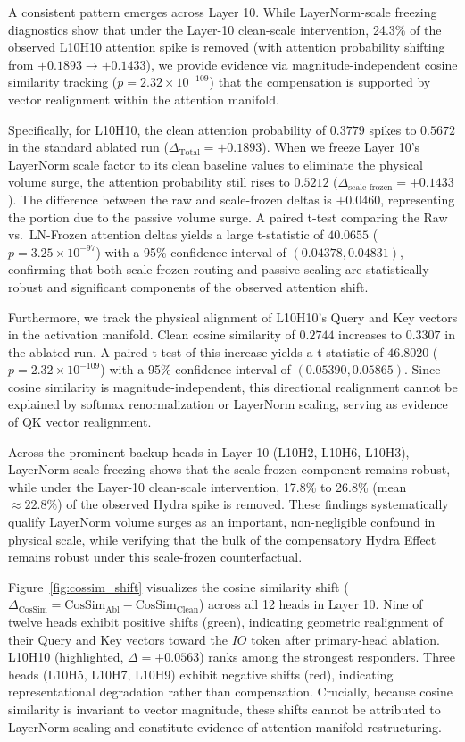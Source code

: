 \documentclass[12pt,a4paper]{article}
\begin{document}
A consistent pattern emerges across Layer 10. While LayerNorm-scale freezing diagnostics show that under the Layer-10 clean-scale intervention, 24.3\% of the observed L10H10 attention spike is removed (with attention probability shifting from $+0.1893 \to +0.1433$), we provide evidence via magnitude-independent cosine similarity tracking ($p = 2.32 \times 10^{-109}$) that the compensation is supported by vector realignment within the attention manifold.

Specifically, for L10H10, the clean attention probability of $0.3779$ spikes to $0.5672$ in the standard ablated run ($\Delta_\text{Total} = +0.1893$). When we freeze Layer 10's LayerNorm scale factor to its clean baseline values to eliminate the physical volume surge, the attention probability still rises to $0.5212$ ($\Delta_\text{scale-frozen} = +0.1433$). The difference between the raw and scale-frozen deltas is $+0.0460$, representing the portion due to the passive volume surge. A paired t-test comparing the Raw vs.\ LN-Frozen attention deltas yields a large t-statistic of $40.0655$ ($p = 3.25 \times 10^{-97}$) with a 95\% confidence interval of $(0.04378, 0.04831)$, confirming that both scale-frozen routing and passive scaling are statistically robust and significant components of the observed attention shift.

Furthermore, we track the physical alignment of L10H10's Query and Key vectors in the activation manifold. Clean cosine similarity of $0.2744$ increases to $0.3307$ in the ablated run. A paired t-test of this increase yields a t-statistic of $46.8020$ ($p = 2.32 \times 10^{-109}$) with a 95\% confidence interval of $(0.05390, 0.05865)$. Since cosine similarity is magnitude-independent, this directional realignment cannot be explained by softmax renormalization or LayerNorm scaling, serving as evidence of QK vector realignment.

Across the prominent backup heads in Layer 10 (L10H2, L10H6, L10H3), LayerNorm-scale freezing shows that the scale-frozen component remains robust, while under the Layer-10 clean-scale intervention, 17.8\% to 26.8\% (mean $\approx 22.8\%$) of the observed Hydra spike is removed. These findings systematically qualify LayerNorm volume surges as an important, non-negligible confound in physical scale, while verifying that the bulk of the compensatory Hydra Effect remains robust under this scale-frozen counterfactual.

Figure~\ref{fig:cossim_shift} visualizes the cosine similarity shift ($\Delta_\text{CosSim} = \text{CosSim}_\text{Abl} - \text{CosSim}_\text{Clean}$) across all 12 heads in Layer 10. Nine of twelve heads exhibit positive shifts (green), indicating geometric realignment of their Query and Key vectors toward the $IO$ token after primary-head ablation. L10H10 (highlighted, $\Delta = +0.0563$) ranks among the strongest responders. Three heads (L10H5, L10H7, L10H9) exhibit negative shifts (red), indicating representational degradation rather than compensation. Crucially, because cosine similarity is invariant to vector magnitude, these shifts cannot be attributed to LayerNorm scaling and constitute evidence of attention manifold restructuring.
\end{document}
